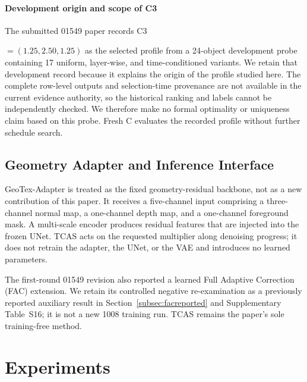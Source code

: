 \documentclass[times,twocolumn,final]{elsarticle}
\providecommand{\DIFadd}[1]{{\protect\color{blue} \sf #1}} %
\providecommand{\DIFaddbegin}{} %
\providecommand{\DIFaddend}{} %
\begin{document}
  \DIFaddbegin \paragraph{Development origin and scope of C3}
\DIFadd{The submitted 01549 paper records }\DIFaddend C3  

 \DIFaddbegin \DIFadd{$=(1.25,2.50,1.25)$ as the selected profile from a 24-object development probe containing 17 uniform, layer-wise, and time-conditioned variants. We retain that development record because it explains the origin of the profile studied here. The complete row-level outputs and selection-time provenance are not available in the current evidence authority, so the historical ranking and labels cannot be independently checked. We therefore make no formal optimality or uniqueness claim based on this probe. Fresh C evaluates the recorded profile without further schedule search}\DIFaddend .

\DIFaddbegin \subsection{Geometry Adapter and Inference Interface}
\label{subsec:adapterimpl}

\DIFaddend GeoTex-Adapter is   \DIFaddbegin \DIFadd{treated as the fixed geometry-residual backbone, not as a new contribution of this paper}\DIFaddend . It receives a   \DIFaddbegin \DIFadd{five-channel input comprising a three-channel }\DIFaddend normal map, a   \DIFaddbegin \DIFadd{one-channel }\DIFaddend depth map, and a   \DIFaddbegin \DIFadd{one-channel }\DIFaddend foreground mask. A multi-scale   \DIFaddbegin \DIFadd{encoder produces residual features that }\DIFaddend are injected into   \DIFaddbegin \DIFadd{the frozen }\DIFaddend UNet. TCAS acts on the   \DIFaddbegin \DIFadd{requested multiplier along denoising progress; it does not retrain the adapter, the UNet, or the VAE and introduces no learned parameters}\DIFaddend .

  \DIFaddbegin \DIFadd{The first-round 01549 revision also reported a learned }\DIFaddend Full Adaptive Correction (FAC)  
 \DIFaddbegin \DIFadd{extension. We retain its controlled negative re-examination as a previously reported auxiliary result in Section~\ref{subsec:facreported} and Supplementary Table~S16; it is not a new 1008 training run. TCAS remains the paper's sole training-free method}\DIFaddend .

\section{Experiments}
\label{sec:experiments}
\end{document}
